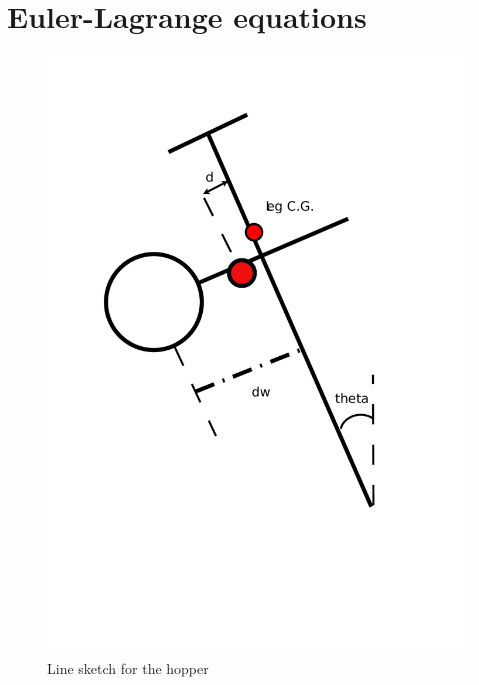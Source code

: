 \section{Euler-Lagrange equations}
\begin{figure}[!htp]
\centering
\includegraphics[scale=0.30]{fig/line_sketch.pdf}
\caption{Line sketch for the hopper}
\label{fig:4_line_sketch}
\end{figure}

